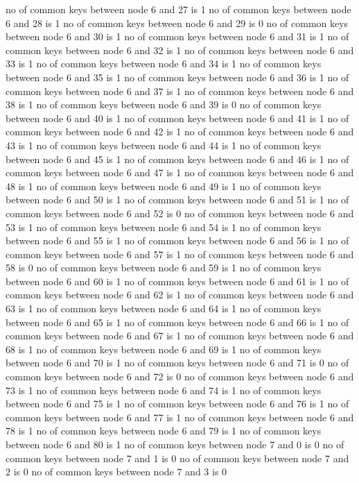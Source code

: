 no of common keys between node 6 and 27 is 1
no of common keys between node 6 and 28 is 1
no of common keys between node 6 and 29 is 0
no of common keys between node 6 and 30 is 1
no of common keys between node 6 and 31 is 1
no of common keys between node 6 and 32 is 1
no of common keys between node 6 and 33 is 1
no of common keys between node 6 and 34 is 1
no of common keys between node 6 and 35 is 1
no of common keys between node 6 and 36 is 1
no of common keys between node 6 and 37 is 1
no of common keys between node 6 and 38 is 1
no of common keys between node 6 and 39 is 0
no of common keys between node 6 and 40 is 1
no of common keys between node 6 and 41 is 1
no of common keys between node 6 and 42 is 1
no of common keys between node 6 and 43 is 1
no of common keys between node 6 and 44 is 1
no of common keys between node 6 and 45 is 1
no of common keys between node 6 and 46 is 1
no of common keys between node 6 and 47 is 1
no of common keys between node 6 and 48 is 1
no of common keys between node 6 and 49 is 1
no of common keys between node 6 and 50 is 1
no of common keys between node 6 and 51 is 1
no of common keys between node 6 and 52 is 0
no of common keys between node 6 and 53 is 1
no of common keys between node 6 and 54 is 1
no of common keys between node 6 and 55 is 1
no of common keys between node 6 and 56 is 1
no of common keys between node 6 and 57 is 1
no of common keys between node 6 and 58 is 0
no of common keys between node 6 and 59 is 1
no of common keys between node 6 and 60 is 1
no of common keys between node 6 and 61 is 1
no of common keys between node 6 and 62 is 1
no of common keys between node 6 and 63 is 1
no of common keys between node 6 and 64 is 1
no of common keys between node 6 and 65 is 1
no of common keys between node 6 and 66 is 1
no of common keys between node 6 and 67 is 1
no of common keys between node 6 and 68 is 1
no of common keys between node 6 and 69 is 1
no of common keys between node 6 and 70 is 1
no of common keys between node 6 and 71 is 0
no of common keys between node 6 and 72 is 0
no of common keys between node 6 and 73 is 1
no of common keys between node 6 and 74 is 1
no of common keys between node 6 and 75 is 1
no of common keys between node 6 and 76 is 1
no of common keys between node 6 and 77 is 1
no of common keys between node 6 and 78 is 1
no of common keys between node 6 and 79 is 1
no of common keys between node 6 and 80 is 1
no of common keys between node 7 and 0 is 0
no of common keys between node 7 and 1 is 0
no of common keys between node 7 and 2 is 0
no of common keys between node 7 and 3 is 0
